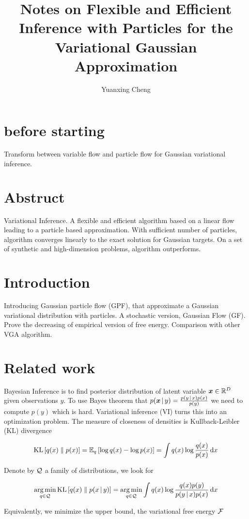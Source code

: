 \documentclass{article}
\title{Notes on Flexible and Efficient Inference with Particles for the Variational Gaussian Approximation}
\author{Yuanxing Cheng}
\begin{document}
\maketitle

\section{before starting}

Transform between variable flow and particle flow for Gaussian variational inference.

\section{Abstruct}
Variational Inference. A flexible and efficient algorithm based on a linear flow leading to a particle based approximation. With sufficient number of particles, algorithm converges linearly to the exact solution for Gaussian targets. On a set of synthetic and high-dimension problems, algorithm outperforms.

\section{Introduction}
Introducing Gaussian particle flow (GPF), that approximate a Gaussian variational distribution with particles. A stochastic version, Gaussian Flow (GF). Prove the decreasing of empirical version of free energy. Comparison with other VGA algorithm.

\section{Related work}
Bayesian Inference is to find posterior distribution of latent variable \(\boldsymbol{x} \in \mathbb{R}^D\) given observations \(y\). To use Bayes theorem that \(p(\boldsymbol{x}\,|\, y)=\frac{p(y\,|\, x)p(x)}{p(y)}\) we need to compute \(p(y)\) which is hard. Variational inference (VI) turns this into an optimization problem. The measure of closeness of densities is Kullback-Leibler (KL) divergence

\[
    \operatorname*{KL} \left[ q(x)\parallel p(x) \right]=\mathbb{E}_q\left[ \log q(x)-\log p(x) \right]=\int q(x)\log \frac{q(x)}{p(x)}\,\mathrm{d} x
\]

Denote by \(\mathcal{Q}\) a family of distributions, we look for

\[\operatorname*{arg\,min}_{q\in\mathcal{Q}} \operatorname*{KL}\left[ q(x)\parallel p(x\,|\, y) \right]=\operatorname*{arg\,min}_{q\in\mathcal{Q}} \int q(x) \log \frac{q(x)p(y)}{p(y\,|\, x)p(x)}\,\mathrm{d} x\]

Equivalently, we minimize the upper bound, the variational free energy \(\mathcal{F}\)
\end{document}
